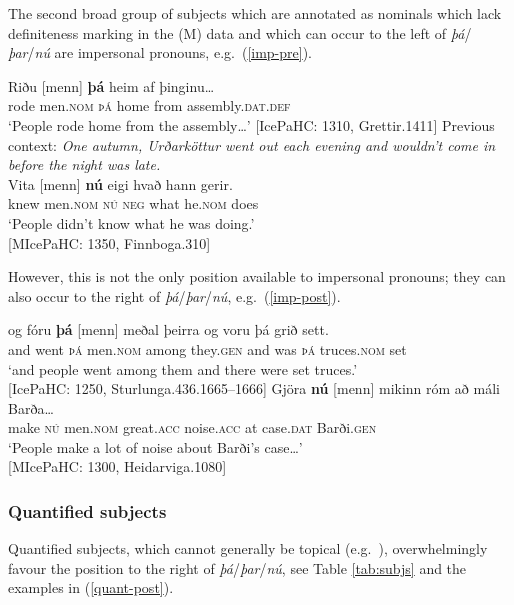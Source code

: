 \documentclass[output=paper,colorlinks,citecolor=brown]{langscibook}
\begin{document}
The second broad group of subjects which are annotated as nominals which lack definiteness marking in the (M) data and which can occur to the left of \textit{þá}/\textit{þar}/\textit{nú} are impersonal pronouns, e.g.~(\ref{imp-pre}). 


\ea \label{imp-pre}
\ea 
\gll Riðu [menn] \textbf{þá} heim af þinginu\dots \\
       rode men.\textsc{nom} \textsc{þá} home from assembly.\textsc{dat.def}\\
\glt `People rode home from the assembly\dots' \hfill [IcePaHC: 1310, Grettir.1411]
\ex  
Previous context: \textit{One autumn, Urðarköttur went out each evening and wouldn't come in before the night was late.}\\
\gll Vita [menn] \textbf{nú} eigi hvað hann gerir.\\
knew men.\textsc{nom} \textsc{nú} \textsc{neg} what he.\textsc{nom} does\\
\glt `People didn't know what he was doing.'\\ \hfill [MIcePaHC: 1350, Finnboga.310]
\z 
\z

\noindent However, this is not the only position available to impersonal pronouns; they can also occur to the right of \textit{þá}/\textit{þar}/\textit{nú}, e.g.~(\ref{imp-post}). 

\ea \label{imp-post}
\ea  
\gll {\dots}og fóru \textbf{þá} [menn] meðal þeirra og voru þá grið sett.\\
and went \textsc{þá} men.\textsc{nom} among they.\textsc{gen} and was \textsc{þá} truces.\textsc{nom} set\\
\glt `and people went among them and there were set truces.' \\ \hfill [IcePaHC: 1250, Sturlunga.436.1665--1666]
\ex 
\gll Gjöra \textbf{nú} [menn] mikinn róm að máli Barða\dots\\
make \textsc{nú} men.\textsc{nom} great.\textsc{acc} noise.\textsc{acc} at case.\textsc{dat} Barði.\textsc{gen}\\
\glt `People make a lot of noise about Barði's case\dots' \\ \hfill [MIcePaHC: 1300, Heidarviga.1080]
\z 
\z 

\subsubsection{Quantified subjects}

Quantified subjects, which cannot generally be topical (e.g.~\citealp{frey2004medial}), overwhelmingly favour the position to the right of \textit{þá}/\textit{þar}/\textit{nú}, see Table \ref{tab:subjs} and the examples in (\ref{quant-post}).
\end{document}
